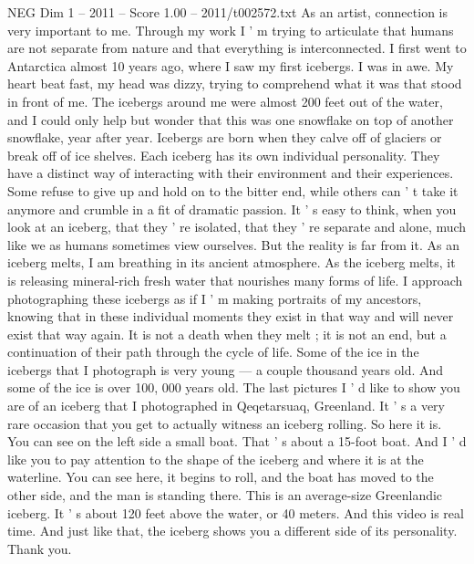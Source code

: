 \begin{textsample}{NEG Dim 1 – 2011 – Score 1.00 – 2011/t002572.txt}  \label{ex:f1_neg_047}
As an artist, connection is very important to me.
Through my work I ' m trying to articulate that humans are not separate from nature and that everything is interconnected.
I first went to Antarctica almost 10 years ago, where I saw my first icebergs.
I was in awe.
My heart beat fast, my head was dizzy, trying to comprehend what it was that stood in front of me.
The icebergs around me were almost 200 feet out of the water, and I could only help but wonder that this was one snowflake on top of another snowflake, year after year.
Icebergs are born when they calve off of glaciers or break off of ice shelves.
Each iceberg has its own individual personality.
They have a distinct way of interacting with their environment and their experiences.
Some refuse to give up and hold on to the bitter end, while others can ' t take it anymore and crumble in a fit of dramatic passion.
It ' s easy to think, when you look at an iceberg, that they ' re isolated, that they ' re separate and alone, much like we as humans sometimes view ourselves.
But the reality is far from it.
As an iceberg melts, I am breathing in its ancient atmosphere.
As the iceberg melts, it is releasing mineral-rich fresh water that nourishes many forms of life.
I approach photographing these icebergs as if I ' m making portraits of my ancestors, knowing that in these individual moments they exist in that way and will never exist that way again.
It is not a death when they melt ; it is not an end, but a continuation of their path through the cycle of life.
Some of the ice in the icebergs that I photograph is very young — a couple thousand years old.
And some of the ice is over 100, 000 years old.
The last pictures I ' d like to show you are of an iceberg that I photographed in Qeqetarsuaq, Greenland.
It ' s a very rare occasion that you get to actually witness an iceberg rolling.
So here it is.
You can see on the left side a small boat.
That ' s about a 15-foot boat.
And I ' d like you to pay attention to the shape of the iceberg and where it is at the waterline.
You can see here, it begins to roll, and the boat has moved to the other side, and the man is standing there.
This is an average-size Greenlandic iceberg.
It ' s about 120 feet above the water, or 40 meters.
And this video is real time.
And just like that, the iceberg shows you a different side of its personality.
Thank you.

\end{textsample}
